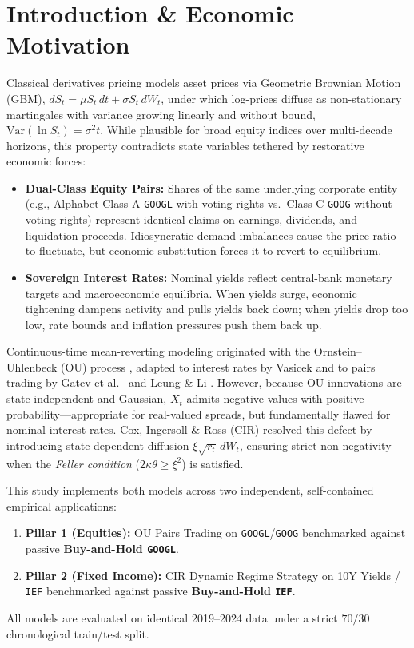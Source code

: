 \documentclass[10pt,twocolumn]{article}
\begin{document}
\section{Introduction \& Economic Motivation}
Classical derivatives pricing models asset prices via Geometric Brownian Motion (GBM), $dS_t = \mu S_t\,dt + \sigma S_t\,dW_t$, under which log-prices diffuse as non-stationary martingales with variance growing linearly and without bound, $\mathrm{Var}(\ln S_t) = \sigma^2 t$. While plausible for broad equity indices over multi-decade horizons, this property contradicts state variables tethered by restorative economic forces:
\begin{itemize}
\item \textbf{Dual-Class Equity Pairs:} Shares of the same underlying corporate entity (e.g., Alphabet Class A \texttt{GOOGL} with voting rights vs.\ Class C \texttt{GOOG} without voting rights) represent identical claims on earnings, dividends, and liquidation proceeds. Idiosyncratic demand imbalances cause the price ratio to fluctuate, but economic substitution forces it to revert to equilibrium.
\item \textbf{Sovereign Interest Rates:} Nominal yields reflect central-bank monetary targets and macroeconomic equilibria. When yields surge, economic tightening dampens activity and pulls yields back down; when yields drop too low, rate bounds and inflation pressures push them back up.
\end{itemize}

Continuous-time mean-reverting modeling originated with the Ornstein--Uhlenbeck (OU) process \cite{uhlenbeck1930}, adapted to interest rates by Vasicek \cite{vasicek1977} and to pairs trading by Gatev et al.\ \cite{gatev2006} and Leung \& Li \cite{leung2015}. However, because OU innovations are state-independent and Gaussian, $X_t$ admits negative values with positive probability---appropriate for real-valued spreads, but fundamentally flawed for nominal interest rates. Cox, Ingersoll \& Ross (CIR) \cite{cir1985} resolved this defect by introducing state-dependent diffusion $\xi\sqrt{r_t}\,dW_t$, ensuring strict non-negativity when the \emph{Feller condition} ($2\kappa\theta \ge \xi^2$) is satisfied.

This study implements both models across two independent, self-contained empirical applications:
\begin{enumerate}
\item \textbf{Pillar 1 (Equities):} OU Pairs Trading on \texttt{GOOGL}/\texttt{GOOG} benchmarked against passive \textbf{Buy-and-Hold \texttt{GOOGL}}.
\item \textbf{Pillar 2 (Fixed Income):} CIR Dynamic Regime Strategy on 10Y Yields / \texttt{IEF} benchmarked against passive \textbf{Buy-and-Hold \texttt{IEF}}.
\end{enumerate}
All models are evaluated on identical 2019--2024 data under a strict $70/30$ chronological train/test split.
\end{document}
